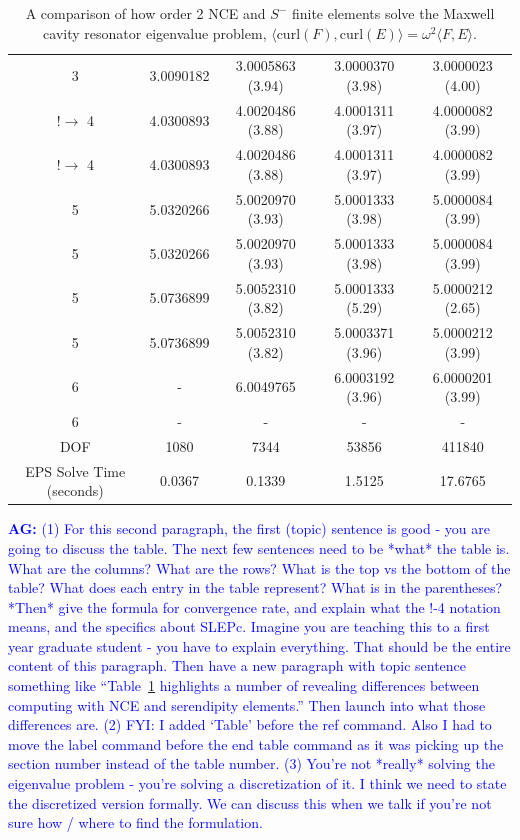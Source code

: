 \documentclass[manuscript,screen]{acmart}
\newcommand{\akg}[1]{\textcolor{blue}{\textbf{AG:} #1}}
\begin{document}
\begin{center}
\begin{table}
\begin{tabular}{ c c c c c }
3 & 3.0090182 & 3.0005863 (3.94) & 3.0000370 (3.98) & 3.0000023 (4.00) \\
$! \rightarrow$ 4 & 4.0300893 & 4.0020486 (3.88) & 4.0001311 (3.97) & 4.0000082 (3.99) \\
$! \rightarrow$ 4 & 4.0300893 & 4.0020486 (3.88) & 4.0001311 (3.97) & 4.0000082 (3.99) \\
5 & 5.0320266 & 5.0020970 (3.93)& 5.0001333 (3.98) & 5.0000084 (3.99) \\
5 & 5.0320266 & 5.0020970 (3.93)& 5.0001333 (3.98) & 5.0000084 (3.99) \\
5 & 5.0736899 & 5.0052310 (3.82) & 5.0001333 (5.29) & 5.0000212 (2.65) \\
5 & 5.0736899 & 5.0052310 (3.82) & 5.0003371 (3.96) & 5.0000212 (3.99) \\
6 & - & 6.0049765 & 6.0003192 (3.96) & 6.0000201 (3.99) \\
6 & - & - & - & - \\
\hline
DOF  & 1080 & 7344 & 53856 & 411840 \\
\hline
EPS Solve Time (seconds) & 0.0367 & 0.1339 & 1.5125 & 17.6765 \\
\hline

\end{tabular}
\caption{A comparison of how order 2 NCE and $S^-$ finite elements solve the Maxwell cavity resonator eigenvalue problem, $\langle \text{curl}(F), \text{curl}(E) \rangle = \omega^2 \langle F, E \rangle$. }  
\label{tab:Eigenvalue}
\end{table}
\end{center}

\akg{(1) For this second paragraph, the first (topic) sentence is good - you are going to discuss the table.  The next few sentences need to be *what* the table is.   What are the columns?  What are the rows?  What is the top vs the bottom of the table?  What does each entry in the table represent?  What is in the parentheses?  *Then* give the formula for convergence rate, and explain what the !-4 notation means, and the specifics about SLEPc. Imagine you are teaching this to a first year graduate student - you have to explain everything.  That should be the entire content of this paragraph.  Then have a new paragraph with topic sentence something like ``Table~\ref{tab:Eigenvalue} highlights a number of revealing differences between computing with NCE and serendipity elements.''  Then launch into what those differences are.
(2) FYI: I added `Table' before the ref command.  Also I had to move the label command before the end table command as it was picking up the section number instead of the table number.  
(3) You're not *really* solving the eigenvalue problem - you're solving a discretization of it.   I think we need to state the discretized version formally.  We can discuss this when we talk if  you're not sure how / where to find the formulation.   }
\end{document}
